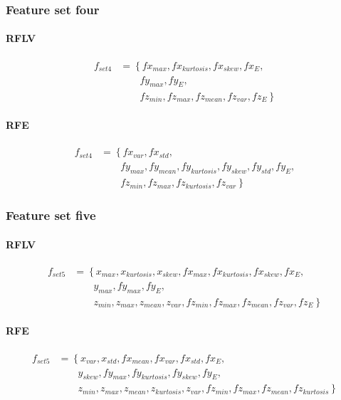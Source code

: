 \documentclass[USenglish]{ifimaster}  %
\begin{document}
\subsubsection{Feature set four}
\paragraph{RFLV}
\begin{align}
f_{set4} &= \left\{fx_{max}, fx_{kurtosis}, fx_{skew}, fx_{E}, \right.\nonumber\\
&\qquad \left.{} fy_{max}, fy_{E}, \right.\nonumber\\
&\qquad \left.{} fz_{min}, fz_{max}, fz_{mean}, fz_{var}, fz_{E} \right\}
\end{align}

\paragraph{RFE}
\begin{align}
f_{set4} &= \left\{fx_{var}, fx_{std}, \right.\nonumber\\
&\qquad \left.{} fy_{max}, fy_{mean}, fy_{kurtosis}, fy_{skew}, fy_{std}, fy_{E}, \right.\nonumber\\
&\qquad \left.{} fz_{min}, fz_{max}, fz_{kurtosis}, fz_{var} \right\}
\end{align}

\subsubsection{Feature set five}
\paragraph{RFLV}
\begin{align}
f_{set5} &= \left\{x_{max}, x_{kurtosis}, x_{skew}, fx_{max}, fx_{kurtosis}, fx_{skew}, fx_{E}, \right.\nonumber\\
&\qquad \left.{} y_{max}, fy_{max}, fy_{E}, \right.\nonumber\\
&\qquad \left.{} z_{min}, z_{max}, z_{mean}, z_{var}, fz_{min}, fz_{max}, fz_{mean}, fz_{var}, fz_{E} \right\}
\end{align}

\paragraph{RFE}
\begin{align}
f_{set5} &= \left\{x_{var}, x_{std}, fx_{mean}, fx_{var}, fx_{std}, fx_{E}, \right.\nonumber\\
&\qquad \left.{} y_{skew}, fy_{max}, fy_{kurtosis}, fy_{skew}, fy_{E}, \right.\nonumber\\
&\qquad \left.{} z_{min}, z_{max}, z_{mean}, z_{kurtosis}, z_{var}, fz_{min}, fz_{max}, fz_{mean}, fz_{kurtosis} \right\}
\end{align}
%
\end{document}
